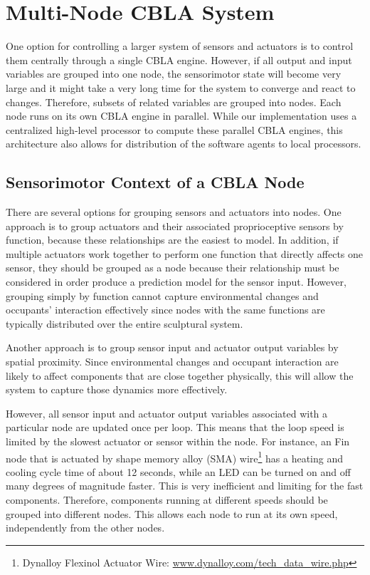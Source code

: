 \section{Multi-Node CBLA System}\label{sec:cbla-system}

One option for controlling a larger system of sensors and actuators is to control them centrally through a single CBLA engine.  However, if all output and input variables are grouped into one node, the sensorimotor state will become very large and it might take a very long time for the system to converge and react to changes. Therefore, subsets of related variables are grouped into nodes. Each node runs on its own CBLA engine in parallel.  While our implementation uses a centralized high-level processor to compute these parallel CBLA engines, this architecture also allows for distribution of the software agents to local processors.

\subsection{Sensorimotor Context of a CBLA Node}

There are several options for grouping sensors and actuators into nodes.  One approach is to group actuators and their associated proprioceptive sensors by function, because these relationships are the easiest to model. In addition, if multiple actuators work together to perform one function that directly affects one sensor, they should be grouped as a node because their relationship must be considered in order produce a prediction model for the sensor input. However, grouping simply by function cannot capture environmental changes and occupants' interaction effectively since nodes with the same functions are typically distributed over the entire sculptural system.

Another approach is to group sensor input and actuator output variables by spatial proximity. Since environmental changes and occupant interaction are likely to affect components that are close together physically, this will allow the system to capture those dynamics more effectively. 

However, all sensor input and actuator output variables associated with a particular node are updated once per loop. This means that the loop speed is limited by the slowest actuator or sensor within the node. For instance, an Fin node that is actuated by shape memory alloy (SMA) wire\footnote{Dynalloy Flexinol Actuator Wire:  \url{www.dynalloy.com/tech_data_wire.php}} has a heating and cooling cycle time of about 12 seconds, while an LED can be turned on and off many degrees of magnitude faster. This is very inefficient and limiting for the fast components. Therefore, components running at different speeds should be grouped into different nodes. This allows each node to run at its own speed, independently from the other nodes. 

